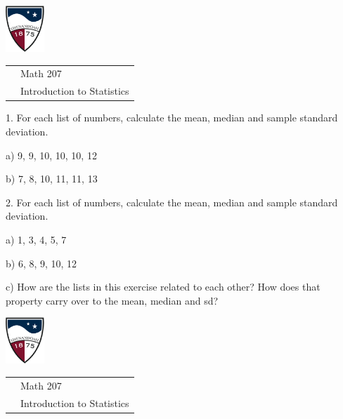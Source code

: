 \documentclass[10pt]{article}
\begin{document}
\pagestyle{empty}

\href{http://www.su.edu}{\includegraphics[height=1.75cm]{sulogo.eps}}
\vspace{-1.69cm}

{\small\hfill
\begin{tabular}{cl}
 & Math 207\\ & Introduction to Statistics\\
\end{tabular}
}

\setlength{\baselineskip}{1.05\baselineskip}
\bigskip\bigskip

1. For each list of numbers, calculate the mean, median and sample
standard deviation.

\hspace{10pt} a) 9, 9, 10, 10, 10, 12
\vspace{.45in}

\hspace{10pt} b) 7, 8, 10, 11, 11, 13
\vspace{.45in}

2. For each list of numbers, calculate the mean, median and sample
standard deviation.  

\hspace{10pt} a) 1, 3, 4, 5, 7
\vspace{.45in}

\hspace{10pt} b) 6, 8, 9, 10, 12
\vspace{.45in}

\hspace{10pt} c)  How are the lists in this exercise related to each other?
How does that property carry over to the mean, median and sd?
\vspace{.7in}


\href{http://www.su.edu}{\includegraphics[height=1.75cm]{sulogo.eps}}
\vspace{-1.69cm}

{\small\hfill
\begin{tabular}{cl}
 & Math 207\\ & Introduction to Statistics\\
\end{tabular}
}
\end{document}
